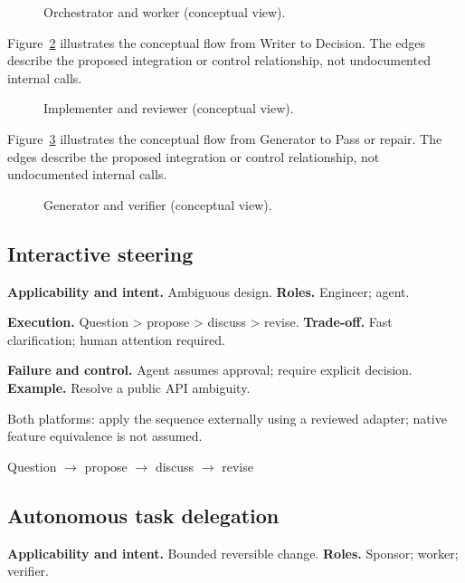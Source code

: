 \begin{figure}[htbp]\centering\caption{Orchestrator and worker (conceptual view).}\label{fig:d12}\end{figure}

Figure~\ref{fig:d13} illustrates the conceptual flow from Writer to Decision. The edges describe the proposed integration or control relationship, not undocumented internal calls.

\begin{figure}[htbp]\centering\caption{Implementer and reviewer (conceptual view).}\label{fig:d13}\end{figure}

Figure~\ref{fig:d14} illustrates the conceptual flow from Generator to Pass or repair. The edges describe the proposed integration or control relationship, not undocumented internal calls.

\begin{figure}[htbp]\centering\caption{Generator and verifier (conceptual view).}\label{fig:d14}\end{figure}

\subsection{Interactive steering}

\textbf{Applicability and intent.} Ambiguous design. \textbf{Roles.} Engineer; agent.

\textbf{Execution.} Question > propose > discuss > revise. \textbf{Trade-off.} Fast clarification; human attention required.

\textbf{Failure and control.} Agent assumes approval; require explicit decision. \textbf{Example.} Resolve a public API ambiguity.

Both platforms: apply the sequence externally using a reviewed adapter; native feature equivalence is not assumed.

\begin{center}\small \textsf{Question} $\rightarrow$ \textsf{propose} $\rightarrow$ \textsf{discuss} $\rightarrow$ \textsf{revise}\end{center}

\subsection{Autonomous task delegation}

\textbf{Applicability and intent.} Bounded reversible change. \textbf{Roles.} Sponsor; worker; verifier.

